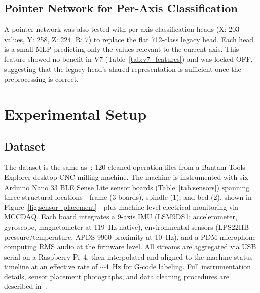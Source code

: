 \documentclass[sensors,article,submit,moreauthors,pdftex]{Definitions/mdpi}
\begin{document}
\subsection{Pointer Network for Per-Axis Classification}

A pointer network was also tested with per-axis classification heads (X: 203 values, Y: 258, Z: 224, R: 7) to replace the flat 712-class legacy head. Each head is a small MLP predicting only the values relevant to the current axis. This feature showed no benefit in V7 (Table~\ref{tab:v7_features}) and was locked OFF, suggesting that the legacy head's shared representation is sufficient once the preprocessing is correct.

\section{Experimental Setup}
\label{sec:experimental}

\subsection{Dataset}

The dataset is the same as~\cite{encoder_paper}: 120 cleaned operation files from a Bantam Tools Explorer\texttrademark{} desktop CNC milling machine. The machine is instrumented with six Arduino Nano 33 BLE Sense Lite sensor boards (Table~\ref{tab:sensors}) spanning three structural locations---frame (3 boards), spindle (1), and bed (2), shown in Figure~\ref{fig:sensor_placement}---plus machine-level electrical monitoring via MCCDAQ. Each board integrates a 9-axis IMU (LSM9DS1: accelerometer, gyroscope, magnetometer at 119~Hz native), environmental sensors (LPS22HB pressure/temperature, APDS-9960 proximity at 10~Hz), and a PDM microphone computing RMS audio at the firmware level. All streams are aggregated via USB serial on a Raspberry Pi~4, then interpolated and aligned to the machine status timeline at an effective rate of $\sim$4~Hz for G-code labeling. Full instrumentation details, sensor placement photographs, and data cleaning procedures are described in~\cite{encoder_paper}.
\end{document}
